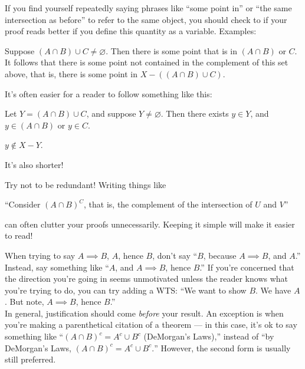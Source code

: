 \documentclass{fkpset}
\begin{document}
\begin{problem}[A5]
  If you find yourself repeatedly saying phrases like ``some point in'' or ``the
  same intersection as before'' to refer to the same object, you should check to
  if your proof reads better if you define this quantity as a variable. Examples:
  \begin{leftbar}
    Suppose $(A \cap B) \cup C \neq \varnothing$. Then there is some point that
    is in $(A\cap B)$ or $C$. It follows that there is some point not contained
    in the complement of this set above, that is, there is some point in $X -
    ((A\cap B)\cup C).$
  \end{leftbar}
  It's often easier for a reader to follow something like this:
  \begin{leftbar}
    Let $Y = (A \cap B) \cup C$, and suppose $Y \neq \varnothing$. Then there
    exists $y \in Y$, and $y \in (A \cap B)$ or $y \in C$.

    $y \not\in X - Y$.
  \end{leftbar}
  It's also shorter!
\end{problem}
\begin{problem}[A6]
  Try not to be redundant! Writing things like
  \begin{leftbar}
    ``Consider $(A \cap B)^C$, that is, the complement of the intersection of
    $U$ and $V$''
  \end{leftbar}
  can often clutter your proofs unnecessarily. Keeping it simple will make it
  easier to read!
\end{problem}
\begin{problem}[A7]
  When trying to say $A \implies B$, $A$, hence $B$, don't say ``$B$, because $A
  \implies B$, and $A$.'' Instead, say something like ``$A$, and $A \implies B$,
  hence $B$.'' If you're concerned that the direction you're going in seems
  unmotivated unless the reader knows what you're trying to do, you can try
  adding a WTS: ``We want to show $B$. We have $A$. But note, $A \implies B$,
  hence $B$.''\\

  In general, justification should come \emph{before} your result. An exception
  is when you're making a parenthetical citation of a theorem --- in this case,
  it's ok to say something like ``$(A \cap B)^c = A^c \cup B^c$ (DeMorgan's
  Laws),'' instead of ``by DeMorgan's Laws, $(A \cap B)^c = A^c \cup B^c.$''
  However, the second form is usually still preferred.
\end{problem}
\end{document}
